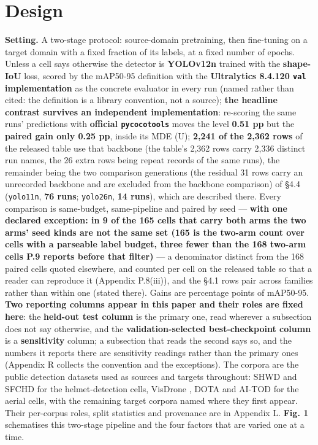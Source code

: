 \documentclass[pdflatex,sn-mathphys-ay]{sn-jnl}
\begin{document}
\section{Design}%

\textbf{Setting.} A two-stage protocol: source-domain pretraining, then fine-tuning on a target domain with a fixed fraction of its labels, at a fixed number of epochs. Unless a cell says otherwise the detector is \textbf{YOLOv12n} \citep{tian2025} trained with the \textbf{shape-IoU} loss, scored by the mAP50-95 definition with the \textbf{Ultralytics 8.4.120 \texttt{val} implementation} as the concrete evaluator in every run (named rather than cited: the definition is a library convention, not a source); \textbf{the headline contrast survives an independent implementation}: re-scoring the same runs' predictions with \textbf{official \texttt{pycocotools}} moves the level \textbf{0.51 pp} but the \textbf{paired gain only 0.25 pp}, inside its MDE (U); \textbf{2,241 of the 2,362 rows} of the released table use that backbone (the table's 2,362 rows carry 2,336 distinct run names, the 26 extra rows being repeat records of the same runs), the remainder being the two comparison generations (the residual 31 rows carry an unrecorded backbone and are excluded from the backbone comparison) of \S{}4.4 (\texttt{yolo11n}, \textbf{76 runs}; \texttt{yolo26n}, \textbf{14 runs}), which are described there. Every comparison is same-budget, same-pipeline and paired by seed --- \textbf{with one declared exception: in 9 of the 165 cells that carry both arms the two arms' seed kinds are not the same set (165 is the two-arm count over cells with a parseable label budget, three fewer than the 168 two-arm cells P.9 reports before that filter)} --- a denominator distinct from the 168 paired cells quoted elsewhere, and counted per cell on the released table so that a reader can reproduce it (Appendix P.8(iii)), and the \S{}4.1 rows pair across families rather than within one (stated there). Gains are percentage points of mAP50-95. \textbf{Two reporting columns appear in this paper and their roles are fixed here}: the \textbf{held-out test column} is the primary one, read wherever a subsection does not say otherwise, and the \textbf{validation-selected best-checkpoint column} is a \textbf{sensitivity} column; a subsection that reads the second says so, and the numbers it reports there are sensitivity readings rather than the primary ones (Appendix R collects the convention and the exceptions). The corpora are the public detection datasets used as sources and targets throughout: SHWD \citep{shwd2020} and SFCHD \citep{yu2023} for the helmet-detection cells, VisDrone \citep{zhu2022}, DOTA \citep{xia2018} and AI-TOD \citep{wang2021} for the aerial cells, with the remaining target corpora named where they first appear. Their per-corpus roles, split statistics and provenance are in Appendix L. \textbf{Fig. 1} schematises this two-stage pipeline and the four factors that are varied one at a time.
\end{document}
